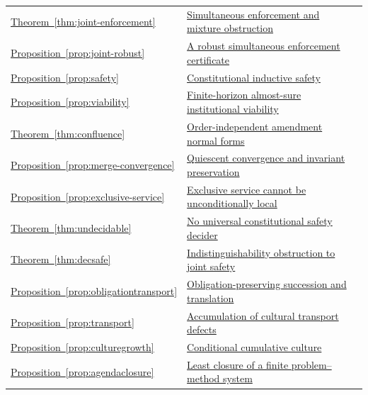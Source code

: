 \begin{longtable}{@{}P{.19\linewidth}P{.69\linewidth}r@{}}
\hyperref[thm:joint-enforcement]{Theorem~\ref*{thm:joint-enforcement}} & \hyperref[thm:joint-enforcement]{Simultaneous enforcement and mixture obstruction} & \pageref{thm:joint-enforcement}\\
\hyperref[prop:joint-robust]{Proposition~\ref*{prop:joint-robust}} & \hyperref[prop:joint-robust]{A robust simultaneous enforcement certificate} & \pageref{prop:joint-robust}\\
\hyperref[prop:safety]{Proposition~\ref*{prop:safety}} & \hyperref[prop:safety]{Constitutional inductive safety} & \pageref{prop:safety}\\
\hyperref[prop:viability]{Proposition~\ref*{prop:viability}} & \hyperref[prop:viability]{Finite-horizon almost-sure institutional viability} & \pageref{prop:viability}\\
\hyperref[thm:confluence]{Theorem~\ref*{thm:confluence}} & \hyperref[thm:confluence]{Order-independent amendment normal forms} & \pageref{thm:confluence}\\
\hyperref[prop:merge-convergence]{Proposition~\ref*{prop:merge-convergence}} & \hyperref[prop:merge-convergence]{Quiescent convergence and invariant preservation} & \pageref{prop:merge-convergence}\\
\hyperref[prop:exclusive-service]{Proposition~\ref*{prop:exclusive-service}} & \hyperref[prop:exclusive-service]{Exclusive service cannot be unconditionally local} & \pageref{prop:exclusive-service}\\
\hyperref[thm:undecidable]{Theorem~\ref*{thm:undecidable}} & \hyperref[thm:undecidable]{No universal constitutional safety decider} & \pageref{thm:undecidable}\\
\hyperref[thm:decsafe]{Theorem~\ref*{thm:decsafe}} & \hyperref[thm:decsafe]{Indistinguishability obstruction to joint safety} & \pageref{thm:decsafe}\\
\hyperref[prop:obligationtransport]{Proposition~\ref*{prop:obligationtransport}} & \hyperref[prop:obligationtransport]{Obligation-preserving succession and translation} & \pageref{prop:obligationtransport}\\
\hyperref[prop:transport]{Proposition~\ref*{prop:transport}} & \hyperref[prop:transport]{Accumulation of cultural transport defects} & \pageref{prop:transport}\\
\hyperref[prop:culturegrowth]{Proposition~\ref*{prop:culturegrowth}} & \hyperref[prop:culturegrowth]{Conditional cumulative culture} & \pageref{prop:culturegrowth}\\
\hyperref[prop:agendaclosure]{Proposition~\ref*{prop:agendaclosure}} & \hyperref[prop:agendaclosure]{Least closure of a finite problem--method system} & \pageref{prop:agendaclosure}\\

\end{longtable}

